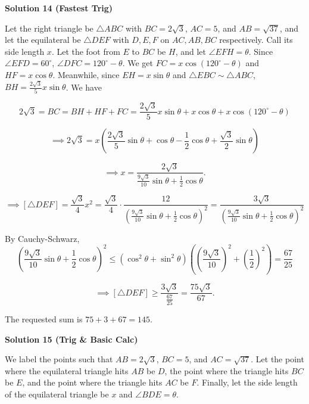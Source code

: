 \begin{enumerate}
\textbf{Solution 14 (Fastest Trig)}

Let the right triangle be $\triangle ABC$ with $BC=2\sqrt{3}$, $AC=5$, and $AB=\sqrt{37}$, and let the equilateral be $\triangle DEF$ with $D, E, F$ on $AC, AB, BC$ respectively. Call its side length $x$. Let the foot from $E$ to $BC$ be $H$, and let $\angle EFH=\theta$. Since $\angle EFD=60^{\circ}$, $\angle DFC=120^{\circ}-\theta$. We get $FC=x\cos(120^{\circ}-\theta)$ and $HF=x\cos\theta$. Meanwhile, since $EH =x\sin\theta$ and $\triangle EBC \sim \triangle ABC$, $BH=\frac{2\sqrt{3}}{5} x\sin\theta$. We have

 
 \[2\sqrt{3}=BC=BH+HF+FC=\frac{2\sqrt{3}}{5}x\sin\theta + x\cos\theta +x\cos\left(120^{\circ}-\theta\right)\]

 \[\implies 2\sqrt{3}=x\left(\frac{2\sqrt{3}}{5}\sin\theta+\cos\theta-\frac{1}{2}\cos\theta+\frac{\sqrt{3}}{2}\sin\theta\right)\]

 \[\implies x=\frac{2\sqrt{3}}{\frac{9\sqrt{3}}{10}\sin\theta+\frac{1}{2}\cos\theta}.\]

 \[\implies [\triangle DEF]=\frac{\sqrt{3}}{4}x^2=\frac{\sqrt{3}}{4}\cdot \frac{12}{\left(\frac{9\sqrt{3}}{10}\sin\theta+\frac{1}{2}\cos\theta\right)^2}=\frac{3\sqrt{3}}{\left(\frac{9\sqrt{3}}{10}\sin\theta+\frac{1}{2}\cos\theta \right)^2}\]

 By Cauchy-Schwarz, 
 \[\left(\frac{9\sqrt{3}}{10}\sin\theta+\frac{1}{2}\cos\theta \right)^2 \le \left(\cos^2\theta+\sin^2\theta\right)\left(\left(\frac{9\sqrt{3}}{10}\right)^2+\left(\frac{1}{2}\right)^2\right)=\frac{67}{25}\]

 \[\implies [\triangle DEF] \ge \frac{3\sqrt{3}}{\frac{67}{25}}=\frac{75\sqrt{3}}{67}.\]

 The requested sum is $75+3+67=\boxed{145}$.

 



\textbf{Solution 15 (Trig & Basic Calc)}

We label the points such that $AB=2\sqrt3$, $BC=5$, and $AC=\sqrt{37}$. Let the point where the equilateral triangle hits $AB$ be $D$, the point where the triangle hits $BC$ be $E$, and the point where the triangle hits $AC$ be $F$. Finally, let the side length of the equilateral triangle be $x$ and $\angle{BDE}=\theta$.


\end{enumerate}
